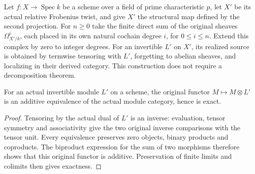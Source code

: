 \begin{definition}
\label{def:kn-actual-di-source}
\leanok
Let $f:X\to\operatorname{Spec}k$ be a scheme over a field of prime
characteristic $p$, let $X'$ be its actual relative Frobenius twist,
and give $X'$ the structural map defined by the second projection.
For $n\geq0$ take the finite direct sum of the original sheaves
$\Omega^i_{X'/k}$, each placed in its own natural cochain degree $i$,
for $0\leq i\leq n$.  Extend this complex by zero to integer degrees.
For an invertible $L'$ on $X'$, its realized source is obtained by
termwise tensoring with $L'$, forgetting to abelian sheaves, and
localizing in their derived category.  This construction does not
require a decomposition theorem.
\end{definition}

\begin{lemma}
\label{lem:kn-line-tensor-exact}
\leanok
For an actual invertible module $L'$ on a scheme, the original
functor $M\mapsto M\otimes L'$ is an additive equivalence of the
actual module category, hence is exact.
\end{lemma}
\begin{proof}
Tensoring by the actual dual of $L'$ is an inverse: evaluation,
tensor symmetry and associativity give the two original inverse
comparisons with the tensor unit.  Every equivalence preserves zero
objects, binary products and coproducts.  The biproduct expression
for the sum of two morphisms therefore shows that this original
functor is additive.  Preservation of finite limits and colimits
then gives exactness.
\end{proof}

